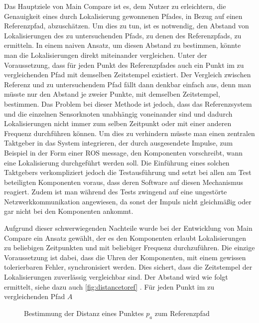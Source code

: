 Das Hauptziele von Main Compare ist es, dem Nutzer zu erleichtern, die
Genauigkeit eines durch Lokalisierung gewonnenen Pfades, in Bezug auf einen
Referenzpfad, abzuschätzen. Um dies zu tun, ist es notwendig, den Abstand von
Lokalisierungen des zu untersuchenden Pfads, zu denen des Referenzpfads, zu
ermitteln. In einem naiven Ansatz, um diesen Abstand zu bestimmen, könnte man die Lokalisierungen direkt
miteinander vergleichen. Unter der Voraussetzung, dass für jeden Punkt des Referenzpfades auch
ein Punkt im zu vergleichenden Pfad mit demselben Zeitstempel existiert. Der
Vergleich zwischen Referenz und zu untersuchendem Pfad fällt dann denkbar einfach aus, denn man müsste nur den Abstand je
zweier Punkte, mit demselben Zeitstempel, bestimmen.
Das Problem bei dieser Methode ist jedoch, dass das Referenzsystem und die
einzelnen Sensorknoten unabhängig voneinander sind und dadurch Lokalisierungen
nicht immer zum selben Zeitpunkt oder mit einer anderen Frequenz durchführen 
können. Um dies zu verhindern müsste man einen zentralen
Taktgeber in das System integrieren, der durch ausgesendete Impulse, zum
Beispiel in der Form einer ROS message, den Komponenten vorschreibt,
wann eine Lokalisierung durchgeführt werden soll.
Die Einführung eines solchen Taktgebers verkompliziert jedoch die
Testausführung und setzt bei allen am Test beteiligten Komponenten voraus, dass
deren Software auf diesen Mechanismus reagiert. Zudem ist man während des Tests
zwingend auf eine ungestörte Netzwerkkommunikation angewiesen, da sonst der
Impuls nicht gleichmäßig oder gar nicht bei den Komponenten ankommt.

Aufgrund dieser schwerwiegenden Nachteile wurde bei der Entwicklung von Main
Compare ein Ansatz gewählt, der es den Komponenten erlaubt Lokalisierungen zu
beliebigen Zeitpunkten und mit beliebiger Frequenz durchzuführen. Die einzige
Voraussetzung ist dabei, dass die Uhren der Komponenten, mit einem gewissen
tolerierbaren Fehler, synchronisiert werden. Dies sichert, dass die Zeitstempel der
Lokalisierungen zuverlässig vergleichbar sind. Der Abstand wird wie folgt
ermittelt, siehe dazu auch \autoref{fig:distancetoref} . Für jeden Punkt im zu vergleichenden Pfad $A$

\begin{figure}[t]
  \begin{center}
  \end{center}
  \caption{Bestimmung der Distanz eines Punktes $p_a$ zum Referenzpfad}
  \label{fig:distancetoref}
\end{figure}

